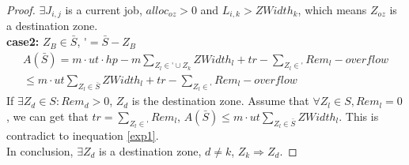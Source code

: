 \documentclass{article}
\begin{document}
\begin{proof}
	$\exists J_{i,j}$ is a current job, $alloc_{oz} > 0$ and $L_{i,k} > ZWidth_k$, which means $Z_{oz}$ is a destination zone. \\
	\textbf{case2:} $Z_B \in \bar{S}$,
	$\mathop{{\bar{S}}'} = \bar{S} - Z_B$
	\[
		\begin{split}
		A(\bar{S}) = m \cdot ut \cdot hp - m \sum\limits_{Z_l \in \mathop{{\bar{S}}'} \cup {Z_k}} ZWidth_l + tr - \sum\limits_{Z_l \in \mathop{{\bar{S}}'}} Rem_l - overflow \\
		\leq m \cdot ut \sum\limits_{Z_l \in \bar{S}} ZWidth_l + tr - \sum\limits_{Z_l \in \mathop{{\bar{S}}'}} Rem_l - overflow
	\end{split}
	\]
	If $\exists Z_d \in S : Rem_d > 0$, $Z_d$ is the destination zone.
	Assume that $\forall Z_l \in S, Rem_l = 0$, we can get that $tr = \sum\limits_{Z_l \in \mathop{{\bar{S}}'}} Rem_l$, 
	$A(\bar{S}) \leq m \cdot ut \sum\limits_{Z_l \in \bar{S}} ZWidth_l$.
	This is contradict to inequation \ref{exp1}.\\
	In conclusion, $\exists Z_d$ is a destination zone, $d \ne k$, $Z_k \Rightarrow Z_d$.
\end{proof}
	
\end{document}

